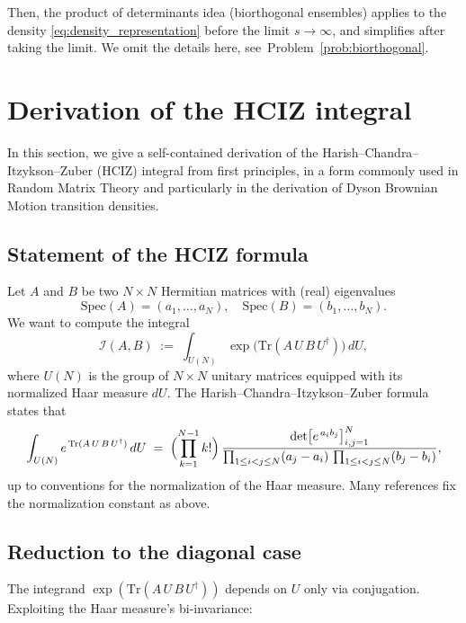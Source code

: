 \documentclass[letterpaper,11pt,oneside,reqno]{article}
\numberwithin{equation}{section}
\theoremstyle{definition}
\begin{document}
Then, the product of determinants idea
(biorthogonal ensembles)
applies
to the density \eqref{eq:density_representation}
before the limit $s\to\infty$,
and simplifies after taking the limit.
We omit the details here,
see~Problem~\ref{prob:biorthogonal}.














\section{Derivation of the HCIZ integral}

In this section, we give a self-contained derivation of the Harish--Chandra--Itzykson--Zuber (HCIZ) integral from first principles, in a form commonly used in Random Matrix Theory and particularly in the derivation of Dyson Brownian Motion transition densities.

\subsection{Statement of the HCIZ formula}

Let \(A\) and \(B\) be two \(N\times N\) Hermitian matrices with (real) eigenvalues
\[
   \mathrm{Spec}(A) = (a_1,\dots,a_N),
   \quad
   \mathrm{Spec}(B) = (b_1,\dots,b_N).
\]
We want to compute the integral
\[
   \mathcal{I}(A,B)
   \;:=\;
   \int_{U(N)}
   \exp\bigl(\mathrm{Tr}(A\,U\,B\,U^\dagger)\bigr)
   \,dU,
\]
where \(U(N)\) is the group of \(N\times N\) unitary matrices equipped with its normalized Haar measure \(dU\).
The Harish--Chandra--Itzykson--Zuber formula states that
\[
   \int_{U(N)}
   e^{\,\mathrm{Tr}(A\,U\,B\,U^\dagger)}
   \,dU
   \;=\;
   \Bigl(\prod_{k=1}^{N-1} k!\Bigr)\,
   \frac{\det\bigl[e^{\,a_i b_j}\bigr]_{i,j=1}^N}{\prod_{1\le i<j\le N}(a_j-a_i)\,\prod_{1\le i<j\le N}(b_j-b_i)},
\]
up to conventions for the normalization of the Haar measure. Many references fix
the normalization constant
as above.

\subsection{Reduction to the diagonal case}

The integrand \(\exp(\mathrm{Tr}(A\,U\,B\,U^\dagger))\) depends on \(U\) only via conjugation.  Exploiting the Haar measure's bi-invariance:
\end{document}
